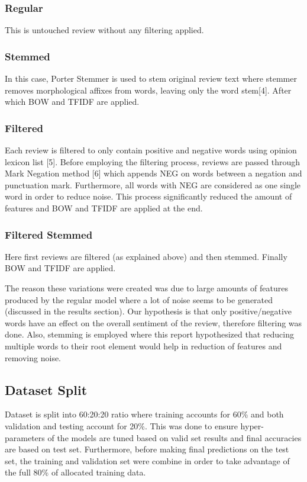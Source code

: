 \documentclass[conference]{IEEEtran}
\begin{document}
\subsubsection{Regular}
This is untouched review without any filtering applied.
\subsubsection{Stemmed}
In this case, Porter Stemmer is used to stem original review text where stemmer removes morphological affixes from words, leaving only the word stem[4]. After which BOW and TFIDF are applied.
\subsubsection{Filtered}
Each review is filtered to only contain positive and negative words using opinion lexicon list [5]. Before employing the filtering process, reviews are passed through Mark Negation method [6] which appends NEG on words between a negation and punctuation mark. Furthermore, all words with NEG are considered as one single word in order to reduce noise. This process significantly reduced the amount of features and BOW and TFIDF are applied at the end.
\subsubsection{Filtered Stemmed}
Here first reviews are filtered (as explained above) and then stemmed. Finally BOW and TFIDF are applied.

The reason these variations were created was due to large amounts of features produced by the regular model where a lot of noise seems to be generated (discussed in the results section).  Our hypothesis is that only positive/negative words have an effect on the overall sentiment of the review, therefore filtering was done. Also, stemming is employed where this report hypothesized that reducing multiple words to their root element would help in reduction of features and removing noise.

\subsection{Dataset Split}
Dataset is split into 60:20:20 ratio where training accounts for 60\% and both validation and testing account for 20\%. This was done to ensure hyper-parameters of the models are tuned based on valid set results and final accuracies are based on test set. Furthermore, before making final predictions on the test set, the training and validation set were combine in order to take advantage of the full 80\% of allocated training data.
\end{document}
